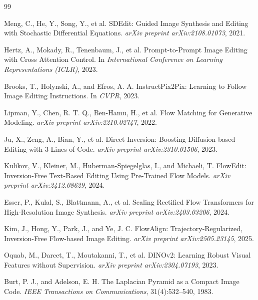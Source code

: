 \documentclass[11pt,a4paper]{ctexart}
\numberwithin{equation}{section}
\begin{document}
\begin{thebibliography}{99}

Meng, C., He, Y., Song, Y., et al.
SDEdit: Guided Image Synthesis and Editing with Stochastic Differential Equations.
\emph{arXiv preprint arXiv:2108.01073}, 2021.

Hertz, A., Mokady, R., Tenenbaum, J., et al.
Prompt-to-Prompt Image Editing with Cross Attention Control.
In \emph{International Conference on Learning Representations (ICLR)}, 2023.

Brooks, T., Holynski, A., and Efros, A. A.
InstructPix2Pix: Learning to Follow Image Editing Instructions.
In \emph{CVPR}, 2023.

Lipman, Y., Chen, R. T. Q., Ben-Hamu, H., et al.
Flow Matching for Generative Modeling.
\emph{arXiv preprint arXiv:2210.02747}, 2022.

Ju, X., Zeng, A., Bian, Y., et al.
Direct Inversion: Boosting Diffusion-based Editing with 3 Lines of Code.
\emph{arXiv preprint arXiv:2310.01506}, 2023.

Kulikov, V., Kleiner, M., Huberman-Spiegelglas, I., and Michaeli, T.
FlowEdit: Inversion-Free Text-Based Editing Using Pre-Trained Flow Models.
\emph{arXiv preprint arXiv:2412.08629}, 2024.

Esser, P., Kulal, S., Blattmann, A., et al.
Scaling Rectified Flow Transformers for High-Resolution Image Synthesis.
\emph{arXiv preprint arXiv:2403.03206}, 2024.

Kim, J., Hong, Y., Park, J., and Ye, J. C.
FlowAlign: Trajectory-Regularized, Inversion-Free Flow-based Image Editing.
\emph{arXiv preprint arXiv:2505.23145}, 2025.

Oquab, M., Darcet, T., Moutakanni, T., et al.
DINOv2: Learning Robust Visual Features without Supervision.
\emph{arXiv preprint arXiv:2304.07193}, 2023.

Burt, P. J., and Adelson, E. H.
The Laplacian Pyramid as a Compact Image Code.
\emph{IEEE Transactions on Communications},
31(4):532--540, 1983.

\end{thebibliography}
\end{document}
